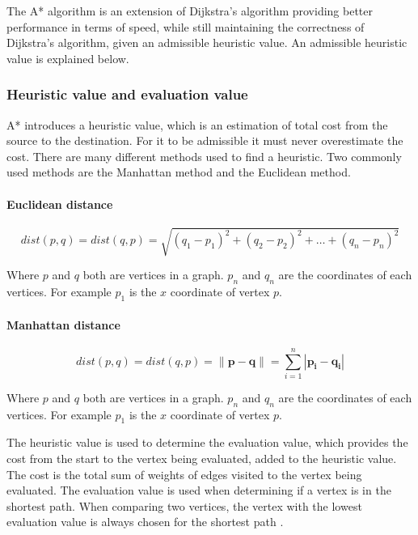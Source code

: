  The A* algorithm is an extension of Dijkstra's algorithm providing better performance in terms of speed, while still maintaining the correctness of Dijkstra's algorithm, given an admissible heuristic value. An admissible heuristic value is explained below.

 
  \subsubsection{Heuristic value and evaluation value}
  A* introduces a heuristic value, which is an estimation of total cost from the source to the destination. For it to be admissible it must never overestimate the cost. There are many different methods used to find a heuristic. Two commonly used methods are the Manhattan method and the Euclidean method. 

    \paragraph{Euclidean distance}\cite{wiki_euclidean}

  \[
    dist(p, q) = dist(q, p) = \sqrt{(q_{1} - p_{1})^2 + (q_{2} - p_{2})^2 + \dots + (q_{n} - p_{n})^2}
  \]

  Where $p$ and $q$ both are vertices in a graph. $p_{n}$ and $q_{n}$ are the coordinates of each vertices. For example $p_{1}$ is the $x$ coordinate of vertex $p$.

    \paragraph{Manhattan distance}\cite{wiki_manhattan_distance}

  \[
    dist(p, q) = dist(q, p) = \| \mathbf{p} - \mathbf{q} \| = \sum\limits_{i=1}^n | \mathbf{p_{i}} - \mathbf{q_{i}} |
  \]

  Where $p$ and $q$ both are vertices in a graph. $p_{n}$ and $q_{n}$ are the coordinates of each vertices. For example $p_{1}$ is the $x$ coordinate of vertex $p$.


  The heuristic value is used to determine the evaluation value, which provides the cost from the start to the vertex being evaluated, added to the heuristic value. The cost is the total sum of weights of edges visited to the vertex being evaluated. The evaluation value is used when determining if a vertex is in the shortest path. When comparing two vertices, the vertex with the lowest evaluation value is always chosen for the shortest path \cite{Patel2013}.


